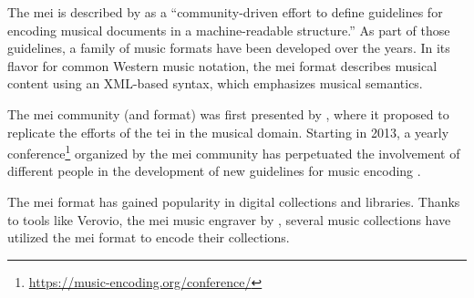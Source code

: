 

The \gls{mei} is described by
\textcite{hankinson2011music} as a ``community-driven effort
to define guidelines for encoding musical documents in a
machine-readable structure.'' As part of those guidelines, a
family of music formats have been developed over the years.
In its flavor for common Western music notation, the \gls{mei}
format describes musical content using an XML-based syntax,
which emphasizes musical semantics.


The \gls{mei} community (and format) was first presented by
\textcite{roland2002music}, where it proposed to replicate
the efforts of the \gls{tei} in the
musical domain. Starting in 2013, a yearly
conference\footnote{\href{https://music-encoding.org/conference/}{https://music-encoding.org/conference/}}
organized by the \gls{mei} community has perpetuated the
involvement of different people in the development of new
guidelines for music encoding
\parencite{crawford2016review}.


The \gls{mei} format has gained popularity in digital collections
and libraries. Thanks to tools like Verovio, the \gls{mei} music
engraver by \textcite{pugin2014verovio}, several music
collections have utilized the \gls{mei} format to encode their
collections.

